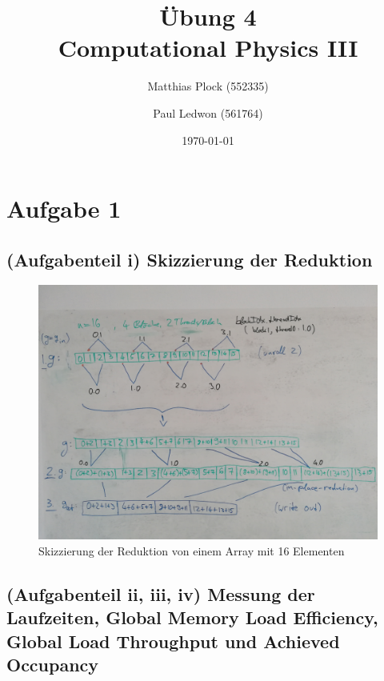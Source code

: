 \documentclass[10pt,a4paper]{article}
\title{Übung 4 \\Computational Physics III}
\author{Matthias Plock (552335) \and Paul Ledwon (561764)} %
\date{\today}
\begin{document}
\maketitle
\tableofcontents

\pagestyle{myheadings}                  %

\section{Aufgabe 1}

\subsection{(Aufgabenteil i) \newline
  Skizzierung der Reduktion}

\begin{figure}[H]
  \centering
  \includegraphics[width=\textwidth]{../figures/reduceUnrollingSketch.jpg}
  \caption{Skizzierung der Reduktion von einem Array mit 16 Elementen}
  \label{fig:skizzierung_reduktion}
\end{figure}



\subsection{(Aufgabenteil ii, iii, iv) \newline
  Messung der Laufzeiten, Global Memory Load Efficiency, Global Load
  Throughput und Achieved Occupancy}
\end{document}
